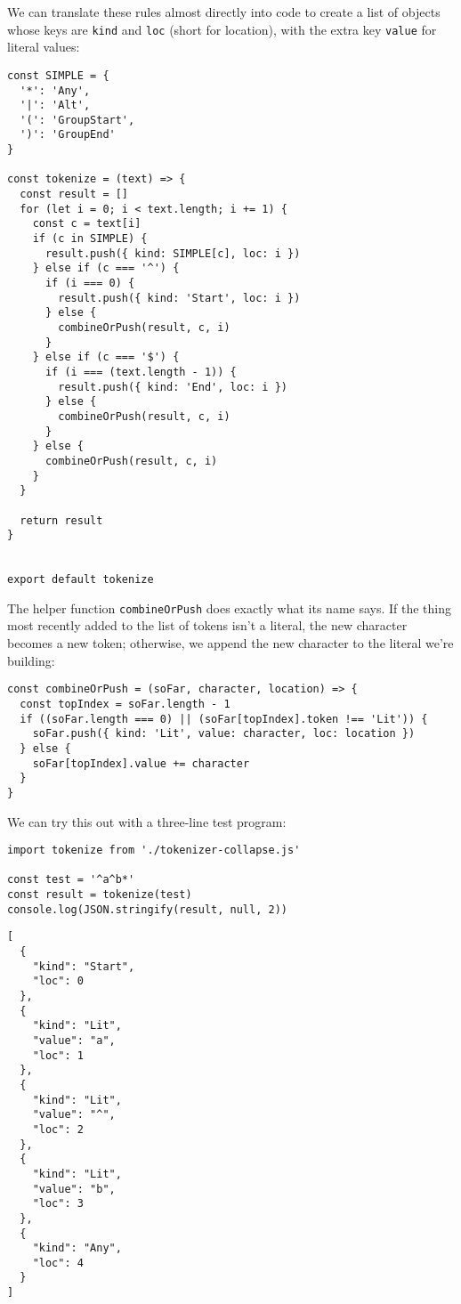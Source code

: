 \documentclass[krantzl]{krantz}
\begin{document}
We can translate these rules almost directly into code
to create a list of objects whose keys are \texttt{kind} and \texttt{loc} (short for location),
with the extra key \texttt{value} for literal values:


\begin{lstlisting}[frame=tblr]
const SIMPLE = {
  '*': 'Any',
  '|': 'Alt',
  '(': 'GroupStart',
  ')': 'GroupEnd'
}

const tokenize = (text) => {
  const result = []
  for (let i = 0; i < text.length; i += 1) {
    const c = text[i]
    if (c in SIMPLE) {
      result.push({ kind: SIMPLE[c], loc: i })
    } else if (c === '^') {
      if (i === 0) {
        result.push({ kind: 'Start', loc: i })
      } else {
        combineOrPush(result, c, i)
      }
    } else if (c === '$') {
      if (i === (text.length - 1)) {
        result.push({ kind: 'End', loc: i })
      } else {
        combineOrPush(result, c, i)
      }
    } else {
      combineOrPush(result, c, i)
    }
  }

  return result
}


export default tokenize
\end{lstlisting}



The helper function \texttt{combineOrPush} does exactly what its name says.
If the thing most recently added to the list of tokens isn’t a literal,
the new character becomes a new token;
otherwise,
we append the new character to the literal we’re building:


\begin{lstlisting}[frame=tblr]
const combineOrPush = (soFar, character, location) => {
  const topIndex = soFar.length - 1
  if ((soFar.length === 0) || (soFar[topIndex].token !== 'Lit')) {
    soFar.push({ kind: 'Lit', value: character, loc: location })
  } else {
    soFar[topIndex].value += character
  }
}
\end{lstlisting}



We can try this out with a three-line test program:


\begin{lstlisting}[frame=tblr]
import tokenize from './tokenizer-collapse.js'

const test = '^a^b*'
const result = tokenize(test)
console.log(JSON.stringify(result, null, 2))
\end{lstlisting}



\begin{lstlisting}[frame=tblr,backgroundcolor=\color{black!5}]
[
  {
    "kind": "Start",
    "loc": 0
  },
  {
    "kind": "Lit",
    "value": "a",
    "loc": 1
  },
  {
    "kind": "Lit",
    "value": "^",
    "loc": 2
  },
  {
    "kind": "Lit",
    "value": "b",
    "loc": 3
  },
  {
    "kind": "Any",
    "loc": 4
  }
]
\end{lstlisting}
\end{document}
